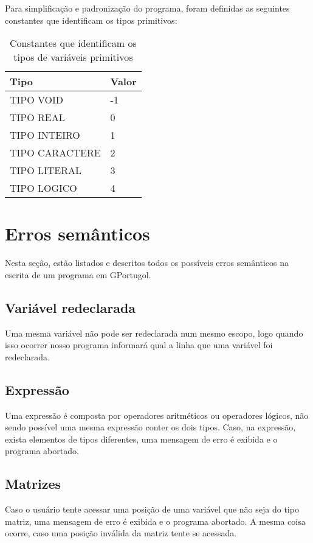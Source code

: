 \documentclass[
12pt,				%
a4paper,			%
english,			%
french,				%
spanish,			%
brazil,				%
article
]{abntex2}
\begin{document}
Para simplificação e padronização do programa, foram definidas as seguintes constantes que identificam os tipos primitivos:

\begin{table}[h]
	\caption{Constantes que identificam os tipos de variáveis primitivos}
	\label{tbl-divisao-sistema}
	\centering
	\begin{tabular}{| p{47mm} | p{100mm} | }\hline		
		\textbf{Tipo} & 
		\textbf{Valor}\\
		\hline
		TIPO VOID & -1\\
		\hline
		TIPO REAL & 0\\
		\hline
		TIPO INTEIRO & 1\\
		\hline
		TIPO CARACTERE & 2\\
		\hline
		TIPO LITERAL & 3\\
		\hline
		TIPO LOGICO & 4\\
		\hline
	\end{tabular}
\end{table}

\section{Erros semânticos}
Nesta seção, estão listados e descritos todos os possíveis erros semânticos na escrita de um programa em GPortugol.

\subsection{Variável redeclarada}
Uma mesma variável não pode ser redeclarada num mesmo escopo, logo quando isso ocorrer nosso programa informará qual a linha que uma variável foi redeclarada.

\subsection{Expressão}
Uma expressão é composta por operadores aritméticos ou operadores lógicos, não sendo possível uma mesma expressão conter os dois tipos. Caso, na expressão, exista elementos de tipos diferentes, uma mensagem de erro é exibida e o programa abortado.

\subsection{Matrizes}
Caso o usuário tente acessar uma posição de uma variável que não seja do tipo matriz, uma mensagem de erro é exibida e o programa abortado. A mesma coisa ocorre, caso uma posição inválida da matriz tente se acessada.
\end{document}
